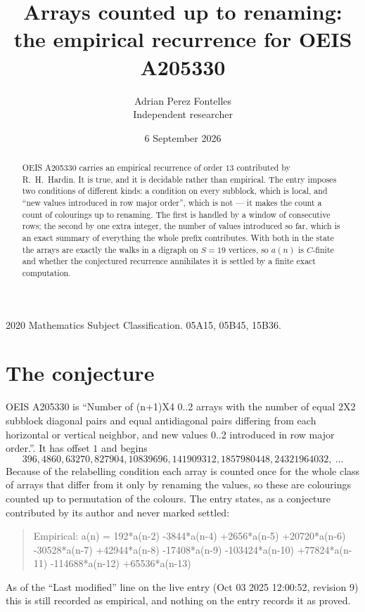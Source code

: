 \documentclass[11pt,a4paper]{article}
\title{Arrays counted up to renaming: the empirical recurrence for OEIS A205330}
\author{Adrian Perez Fontelles\\ \small Independent researcher}
\date{6 September 2026}
\theoremstyle{plain}
\theoremstyle{definition}
\begin{document}
\maketitle

\begin{abstract}
OEIS A205330 carries an empirical recurrence of order $13$ contributed by R.~H.~Hardin. It is
true, and it is decidable rather than empirical. The entry imposes two conditions of different
kinds: a condition on every subblock, which is local, and ``new values introduced in row major
order'', which is not --- it makes the count a count of colourings up to renaming. The first is
handled by a window of consecutive rows; the second by one extra integer, the number of values
introduced so far, which is an exact summary of everything the whole prefix contributes. With
both in the state the arrays are exactly the walks in a digraph on $S=19$ vertices, so $a(n)$
is $C$-finite and whether the conjectured recurrence annihilates it is settled by a finite
exact computation.
\end{abstract}

\noindent\small 2020 Mathematics Subject Classification. 05A15, 05B45, 15B36.\normalsize

\section{The conjecture}

OEIS A205330 is ``Number of (n+1)X4 0..2 arrays with the number of equal 2X2 subblock diagonal pairs and equal antidiagonal pairs differing from each horizontal or vertical neighbor, and new values 0..2 introduced in row major order.''. It has offset $1$ and begins
\[
396, 4860, 63270, 827904, 10839696, 141909312, 1857980448, 24321964032,\ \dots
\]
Because of the relabelling condition each array is counted once for the whole class of arrays that differ from it only by renaming the values, so these are colourings counted up to permutation of the colours.
The entry states, as a conjecture contributed by its author and never marked settled:
\begin{quote}
Empirical: a(n) = 192*a(n-2) -3844*a(n-4) +2656*a(n-5) +20720*a(n-6) -30528*a(n-7) +42944*a(n-8) -17408*a(n-9) -103424*a(n-10) +77824*a(n-11) -114688*a(n-12) +65536*a(n-13)
\end{quote}
As of the ``Last modified'' line on the live entry (Oct 03 2025 12:00:52, revision 9) this is still
recorded as empirical, and nothing on the entry records it as proved.
\end{document}
